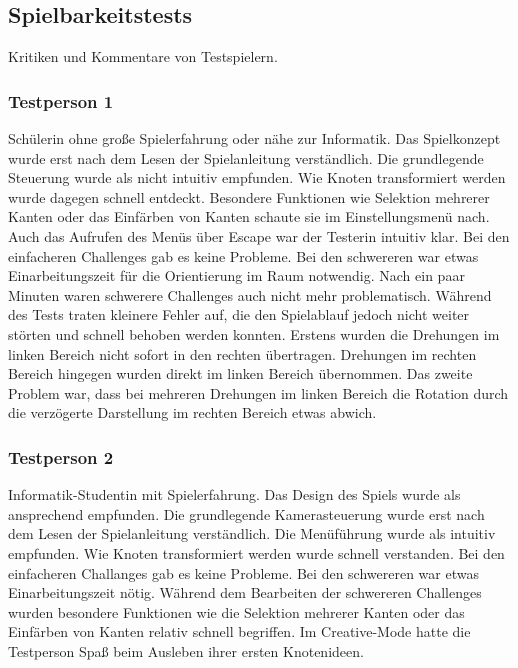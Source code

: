 %



\newpage



\label{Abschnitt:Tests:Protokoll:Abnahme}



\subsection*{Spielbarkeitstests}

Kritiken und Kommentare von Testspielern.\\



\subsubsection*{Testperson 1}

Schülerin ohne große Spielerfahrung oder nähe zur Informatik. Das Spielkonzept wurde erst nach dem Lesen der Spielanleitung verständlich. Die grundlegende Steuerung wurde als nicht intuitiv empfunden. Wie Knoten transformiert werden wurde dagegen schnell entdeckt. Besondere Funktionen wie Selektion mehrerer Kanten oder das Einfärben von Kanten schaute sie im Einstellungsmenü nach. Auch das Aufrufen des Menüs über Escape war der Testerin intuitiv klar. Bei den einfacheren Challenges gab es keine Probleme. Bei den schwereren war etwas Einarbeitungszeit für die Orientierung im Raum notwendig. Nach ein paar Minuten waren schwerere Challenges auch nicht mehr problematisch. Während des Tests traten kleinere Fehler auf, die den Spielablauf jedoch nicht weiter störten und schnell behoben werden konnten. Erstens wurden die Drehungen im linken Bereich nicht sofort in den rechten übertragen. Drehungen im rechten Bereich hingegen wurden direkt im linken Bereich übernommen. Das zweite Problem war, dass bei mehreren Drehungen im linken Bereich die Rotation durch die verzögerte Darstellung im rechten Bereich etwas abwich.

\subsubsection*{Testperson 2}

Informatik-Studentin mit Spielerfahrung. Das Design des Spiels wurde als ansprechend empfunden. Die grundlegende Kamerasteuerung wurde erst nach dem Lesen der Spielanleitung verständlich. Die Menüführung wurde als intuitiv empfunden. Wie Knoten transformiert werden wurde schnell verstanden. Bei den einfacheren Challanges gab es keine Probleme. Bei den schwereren war etwas Einarbeitungszeit nötig. Während dem Bearbeiten der schwereren Challenges wurden besondere Funktionen wie die Selektion mehrerer Kanten oder das Einfärben von Kanten relativ schnell begriffen. Im Creative-Mode hatte die Testperson Spaß beim Ausleben ihrer ersten Knotenideen.


